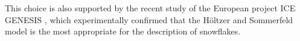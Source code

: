 	
	
	
	
	
	
	
	
	
	
	
%	
		
		
		This choice is also supported by the recent study of the European project ICE GENESIS , which experimentally confirmed that the H\"oltzer and Sommerfeld model is the most appropriate for the description of snowflakes. 
		
%		
		

		
	

